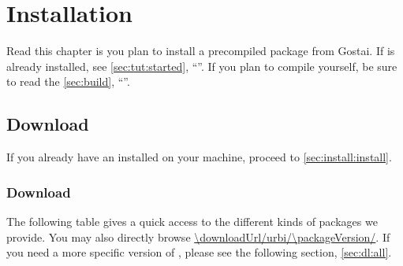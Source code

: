 
\chapter{Installation}
\label{sec:installation}

Read this chapter is you plan to install a precompiled package from Gostai.
If \urbi is already installed, see \autoref{sec:tut:started},
``''.  If you plan to compile \urbi yourself, be
sure to read the \autoref{sec:build}, ``''.

\section{Download}

If you already have an \urbi installed on your machine, proceed to
\autoref{sec:install:install}.

\subsection{Download \urbi \packageVersion}
\label{sec:dl:latest}

The following table gives a quick access to the different kinds of packages
we provide.  You may also directly browse
\url{\downloadUrl/urbi/\packageVersion/}.  If you need a more specific
version of \usdk, please see the following section, \autoref{sec:dl:all}.

